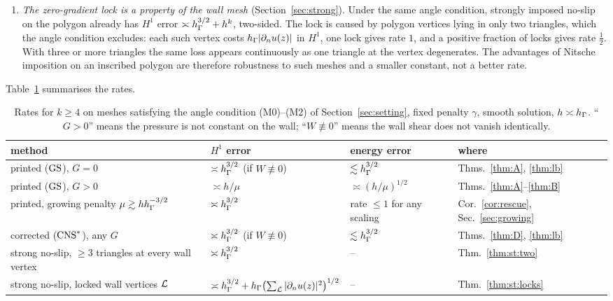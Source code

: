\begin{enumerate}[label=(\arabic*)]
\item \emph{The zero-gradient lock is a property of the wall mesh} (Section~\ref{sec:strong}). Under the same angle condition, strongly imposed no-slip on the polygon already has $H^1$ error $\asymp h_\Gamma^{3/2}+h^k$, two-sided. The lock is caused by polygon vertices lying in only two triangles, which the angle condition excludes: each such vertex costs $h_\Gamma|\partial_n u(z)|$ in $H^1$, one lock gives rate $1$, and a positive fraction of locks gives rate $\frac12$. With three or more triangles the same loss appears continuously as one triangle at the vertex degenerates. The advantages of Nitsche imposition on an inscribed polygon are therefore robustness to such meshes and a smaller constant, not a better rate.
\end{enumerate}
Table~\ref{tab:summary} summarises the rates.

\begin{table}[htb]
\centering\small
\caption{Rates for $k\ge4$ on meshes satisfying the angle condition (M0)--(M2) of Section~\ref{sec:setting}, fixed penalty $\gamma$, smooth solution, $h\asymp h_\Gamma$. ``$G>0$'' means the pressure is not constant on the wall; ``$W\not\equiv0$'' means the wall shear does not vanish identically.}\label{tab:summary}
\begin{tabular}{>{\raggedright\arraybackslash}p{}>{\raggedright\arraybackslash}p{}>{\raggedright\arraybackslash}p{}>{\raggedright\arraybackslash}p{}}
\toprule
method & $H^1$ error & energy error & where\\
\midrule
printed ($\mathrm{GS}$), $G=0$ & $\asymp h_\Gamma^{3/2}$ (if $W\not\equiv0$) & $\lesssim h_\Gamma^{3/2}$ & Thms.~\ref{thm:A}, \ref{thm:lb}\\
printed ($\mathrm{GS}$), $G>0$ & $\asymp h/\mu$ & $\asymp(h/\mu)^{1/2}$ & Thms.~\ref{thm:A}--\ref{thm:B}\\
printed, growing penalty $\mu\gtrsim hh_\Gamma^{-3/2}$ & $\asymp h_\Gamma^{3/2}$ & rate $\le1$ for any scaling & Cor.~\ref{cor:rescue}, Sec.~\ref{sec:growing}\\
corrected ($\mathrm{CNS}^\ast$), any $G$ & $\asymp h_\Gamma^{3/2}$ (if $W\not\equiv0$) & $\lesssim h_\Gamma^{3/2}$ & Thms.~\ref{thm:D}, \ref{thm:lb}\\
strong no-slip, $\ge3$ triangles at every wall vertex & $\asymp h_\Gamma^{3/2}$ & -- & Thm.~\ref{thm:st:two}\\
strong no-slip, locked wall vertices $\mathcal L$ & $\asymp h_\Gamma^{3/2}+h_\Gamma\bigl(\sum_{\mathcal L}|\partial_n u(z)|^2\bigr)^{1/2}$ & -- & Thm.~\ref{thm:st:locks}\\
\bottomrule
\end{tabular}
\end{table}

